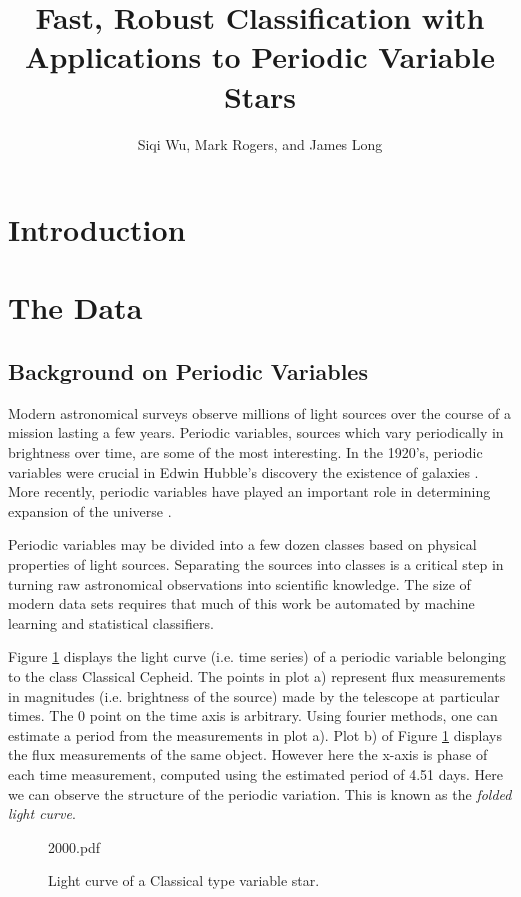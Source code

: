 \documentclass[11pt]{article}
\begin{document}
\title{Fast, Robust Classification with Applications to Periodic Variable Stars}
\author{Siqi Wu, Mark Rogers, and James Long}
\maketitle


\section{Introduction}

\section{The Data}
\subsection{Background on Periodic Variables}
Modern astronomical surveys observe millions of light sources over the course of a mission lasting a few years. Periodic variables, sources which vary periodically in brightness over time, are some of the most interesting. In the 1920's, periodic variables were crucial in Edwin Hubble's discovery the existence of galaxies \cite{berendzen1971hubble}. More recently, periodic variables have played an important role in determining expansion of the universe \cite{freedman2010hubble}.

Periodic variables may be divided into a few dozen classes based on physical properties of light sources. Separating the sources into classes is a critical step in turning raw astronomical observations into scientific knowledge. The size of modern data sets requires that much of this work be automated by machine learning and statistical classifiers. 

Figure \ref{fig:cepheid} displays the light curve (i.e. time series) of a periodic variable belonging to the class Classical Cepheid. The points in plot a) represent flux measurements in magnitudes (i.e. brightness of the source) made by the telescope at particular times. The 0 point on the time axis is arbitrary. Using fourier methods, one can estimate a period from the measurements in plot a).  Plot b) of Figure \ref{fig:cepheid} displays the flux measurements of the same object. However here the x-axis is phase of each time measurement, computed using the estimated period of 4.51 days. Here we can observe the structure of the periodic variation. This is known as the \textit{folded light curve}.
\begin{figure}[h]
  \begin{center}
    \begin{includegraphics}[scale=.5]{2000.pdf}
      \caption{Light curve of a Classical type variable star.\label{fig:cepheid}}
    \end{includegraphics}
  \end{center}
\end{figure}
\end{document}
